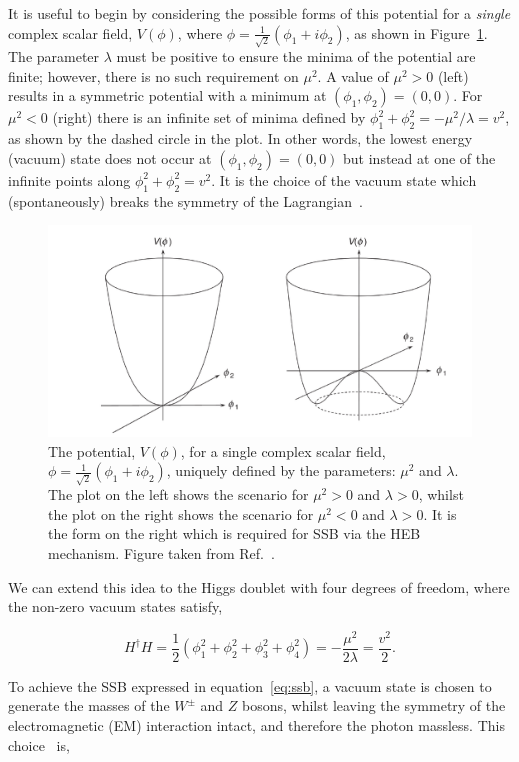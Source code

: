 \noindent
It is useful to begin by considering the possible forms of this potential for a \textit{single} complex scalar field, $V(\phi)$, where $\phi=\frac{1}{\sqrt{2}}(\phi_1+i\phi_2)$, as shown in Figure~\ref{fig:higgs_potential}. The parameter $\lambda$ must be positive to ensure the minima of the potential are finite; however, there is no such requirement on $\mu^2$. A value of $\mu^2>0$ (left) results in a symmetric potential with a minimum at $(\phi_1,\phi_2)=(0,0)$. For $\mu^2<0$ (right) there is an infinite set of minima defined by $\phi_1^2+\phi_2^2=-\mu^2/\lambda=v^2$, as shown by the dashed circle in the plot. In other words, the lowest energy (vacuum) state does not occur at $(\phi_1,\phi_2)=(0,0)$ but instead at one of the infinite points along $\phi_1^2+\phi_2^2=v^2$. It is the choice of the vacuum state which (spontaneously) breaks the symmetry of the Lagrangian~\cite{Thomson:2013zua}.

\begin{figure}[htb!]
  \centering
  \includegraphics[width=.65\linewidth]{Figures/theory/higgs_potential.pdf}
  \caption[The Higgs potential]
  {
    The potential, $V(\phi)$, for a single complex scalar field, $\phi=\frac{1}{\sqrt{2}}(\phi_1+i\phi_2)$, uniquely defined by the parameters: $\mu^2$ and $\lambda$. The plot on the left shows the scenario for $\mu^2>0$ and $\lambda>0$, whilst the plot on the right shows the scenario for $\mu^2<0$ and $\lambda>0$. It is the form on the right which is required for SSB via the HEB mechanism. Figure taken from Ref.~\cite{Thomson:2013zua}.
  }
  \label{fig:higgs_potential}
\end{figure}

We can extend this idea to the Higgs doublet with four degrees of freedom, where the non-zero vacuum states satisfy,

\begin{equation}
    H^{\dagger}H = \frac{1}{2}(\phi_1^2+\phi_2^2+\phi_3^2+\phi_4^2) = -\frac{\mu^2}{2\lambda} = \frac{v^2}{2}.
\end{equation}

\noindent
To achieve the SSB expressed in equation~\ref{eq:ssb}, a vacuum state is chosen to generate the masses of the $W^\pm$ and $Z$ bosons, whilst leaving the symmetry of the electromagnetic (EM) interaction intact, and therefore the photon massless. This choice~\cite{Weinberg:1967tq} is,

